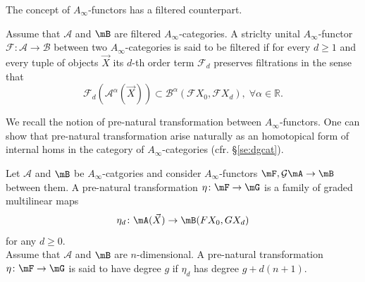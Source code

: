 The concept of $A_{\infty}$-functors has a filtered counterpart. 
\begin{dfn}
  Assume that $\mathcal{A}$ and $\mB$ are filtered $A_\infty$-categories. A striclty unital
$A_{\infty}$-functor
$\mathcal{F}: \mathcal{A} \longrightarrow \mathcal{B}$ between two
$A_{\infty}$-categories is said to be filtered if for every $d \geq 1$
and every tuple of objects $\vec{X}$ its $d$-th order term
$\mathcal{F}_d$ preserves filtrations in the sense that
$$\mathcal{F}_d(\mathcal{A}^{\alpha}(\vec{X})) \subset
\mathcal{B}^{\alpha}(\mathcal{F}X_0, \mathcal{F}X_d), \; \forall
\alpha \in \mathbb{R}.$$ 
\end{dfn}
We recall the notion of pre-natural transformation between $A_\infty$-functors. One can show that pre-natural transformation arise naturally as an homotopical form of internal homs in the category of $A_\infty$-categories (cfr. \S\ref{se:dgcat}).

\begin{dfn}
  Let $\mathcal{A}$ and $\mB$ be $A_\infty$-catgories and consider $A_\infty$-functors $\mF,\mathcal{G}\mA\to \mB$ between them. A pre-natural transformation $\eta\colon \mF\to\mG$ is a family of graded multilinear maps $$ \eta_d\colon \mA(\vec{X})\to \mB(FX_0,GX_d)$$for any $d\geq 0$. \\
  Assume that $\mathcal{A}$ and $\mB$ are $n$-dimensional. A pre-natural transformation $\eta\colon \mF\to\mG$ is said to have degree $g$ if $\eta_d$ has degree $g+d(n+1)$.
\end{dfn}




